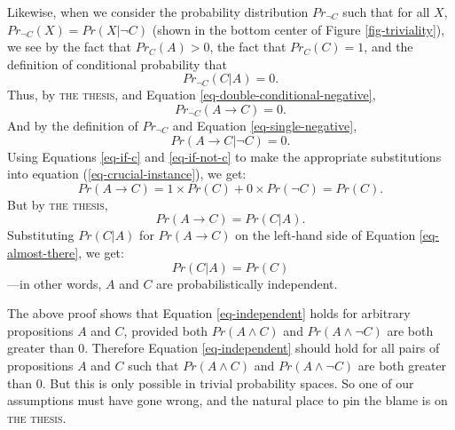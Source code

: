 Likewise, when we consider the probability distribution $Pr_{\neg C}$ such that for all $X$, $Pr_{\neg C}(X) = Pr(X|\neg C)$ (shown in the bottom center of Figure \ref{fig-triviality}), we see by the fact that $Pr_C(A) >0$, the fact that $Pr_C(C) =1$, and the definition of conditional probability that
%
\begin{equation}
\label{eq-double-conditional-negative}
Pr_{\neg C}(C|A) = 0.
\end{equation}
%
Thus, by \textsc{the thesis}, and Equation \ref{eq-double-conditional-negative},
%
\begin{equation}
\label{eq-single-negative}
Pr_{\neg C}(A \rightarrow C) = 0.
\end{equation}
%
And by the definition of $Pr_{\neg C}$ and Equation \ref{eq-single-negative},
\begin{equation}
\label{eq-if-not-c}Pr(A \rightarrow C|\neg C) = 0.
\end{equation}
%
Using Equations \ref{eq-if-c} and \ref{eq-if-not-c} to make the appropriate substitutions into equation (\ref{eq-crucial-instance}), we get:
%
\begin{equation}
\label{eq-almost-there}
Pr(A \rightarrow C) = 1 \times Pr(C) + 0 \times Pr(\neg C) = Pr(C).
\end{equation}
%
But by \textsc{the thesis},
%
\begin{equation}
Pr(A \rightarrow C) = Pr(C|A).
\end{equation}
%
Substituting $Pr(C|A)$ for $Pr(A \rightarrow C)$ on the left-hand side of Equation \ref{eq-almost-there}, we get:
%
\begin{equation}
\label{eq-independent}
Pr(C|A) = Pr(C)
\end{equation}
%
---in other words, $A$ and $C$ are probabilistically independent.

The above proof shows that Equation \ref{eq-independent} holds for arbitrary propositions $A$ and $C$, provided both $Pr(A \wedge C)$ and $Pr(A \wedge \neg C)$ are both greater than 0.  Therefore Equation \ref{eq-independent} should hold for all pairs of propositions $A$ and $C$ such that $Pr(A \wedge C)$ and $Pr(A \wedge \neg C)$ are both greater than 0.  But this is only possible in trivial probability spaces.  So one of our assumptions must have gone wrong, and the natural place to pin the blame is on \textsc{the thesis}.

